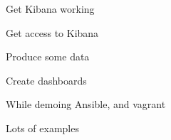 \documentclass[20pt,landscape,a4paper,footrule]{foils}
\begin{document}

\begin{list2}
\item Get Kibana working
\item Get access to Kibana
\item Produce some data
\item Create dashboards
\end{list2}

While demoing Ansible, and vagrant

Lots of examples\\


\myquestionspage





\end{document}
